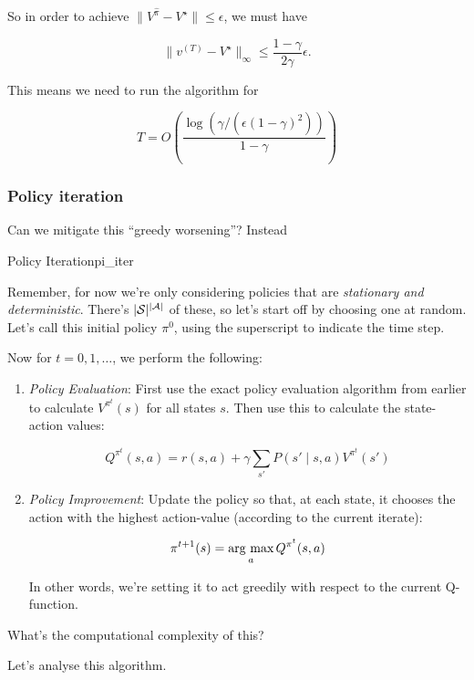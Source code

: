 \documentclass[../main/main]{subfiles}
\begin{document}
So in order to achieve $\|V^{\hat \pi} - V^{\star}\| \le \epsilon$, we must have

\[
    \|v^{(T)} - V^\star\|_{\infty} \le \frac{1-\gamma}{2 \gamma} \epsilon.
\]

This means we need to run the algorithm for

\[
    T = O\left( \frac{\log(\gamma/(\epsilon (1-\gamma)^2))}{1-\gamma} \right)
\]

\subsubsection{Policy iteration}

Can we mitigate this ``greedy worsening''? Instead

\begin{theorem}{Policy Iteration}{pi_iter}

Remember, for now we're only considering policies that are
\emph{stationary and deterministic}. There's $|\mathcal{S}|^{|\mathcal{A}|}$ of these, so let's
start off by choosing one at random. Let's call this initial policy $\pi^0$,
using the superscript to indicate the time step.

Now for $t = 0, 1, \dots$, we perform the following:

\begin{enumerate}
    
\item \emph{Policy Evaluation}: First use the exact policy evaluation algorithm from earlier to
    calculate $V^{\pi^t}(s)$ for all states $s$. Then use this to calculate the
    state-action values:

    \[
        Q^{\pi^t}(s, a) = r(s, a) + \gamma \sum_{s'} P(s' \mid s, a) V^{\pi^t} (s')
    \]

\item \emph{Policy Improvement}: Update the policy so that, at each state,
    it chooses the action with the highest action-value (according to the current iterate):

    \[
        \pi^{t+1}(s) = \operatorname*{\textrm{arg\ max}}_a Q^{\pi^t} (s, a)
    \]

    In other words, we're setting it to act greedily with respect to the current Q-function.
\end{enumerate}

What's the computational complexity of this?


Let's analyse this algorithm.


\end{theorem}

\end{document}
